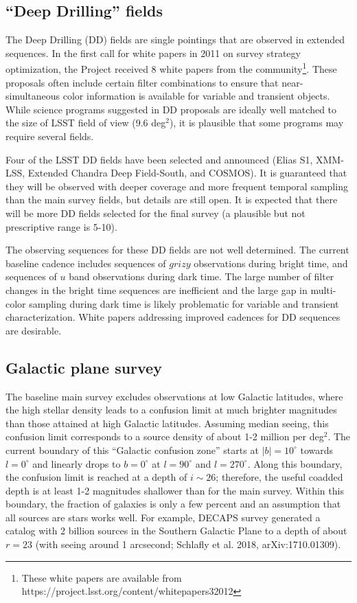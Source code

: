 \documentclass[DM,lsstdraft,toc,usenatbib]{lsstdoc}
\begin{document}
\subsection{``Deep Drilling'' fields} 

The Deep Drilling (DD) fields are single pointings that are observed in extended sequences. 
In the first call for white papers in 2011 on survey strategy optimization, the Project received 
8 white papers from the community\footnote{These white papers are available from 
https://project.lsst.org/content/whitepapers32012}. These proposals often include certain 
filter combinations to ensure that near-simultaneous color information is available for 
variable and transient objects. While science programs suggested in DD proposals are ideally well 
matched to the size of LSST field of view (9.6 deg$^2$), it is plausible that some
programs may require several fields. 

Four of the LSST DD fields have been selected and announced (Elias S1, 
XMM-LSS, Extended Chandra Deep Field-South, and COSMOS). It is guaranteed that they 
will be observed with deeper coverage and more frequent temporal sampling than the main 
survey fields, but details are still open. It is expected that there will be more DD fields 
selected for the final survey (a plausible but not prescriptive range is 5-10). 

The observing sequences for these DD fields are not well determined. The current baseline
cadence includes sequences of $grizy$ observations during bright time, and sequences of $u$ 
band observations during dark time. The large number of filter changes in the bright time sequences
are inefficient and the large gap in multi-color sampling during dark time is likely problematic 
for variable and transient characterization. White papers addressing improved cadences for DD 
sequences are desirable.


\subsection{Galactic plane survey \label{sec:GP}}

The baseline main survey excludes observations at low Galactic latitudes, where the high 
stellar density leads to a confusion limit at much brighter magnitudes than those attained 
at high Galactic latitudes. Assuming median seeing, this confusion limit corresponds to a
source density of about 1-2 million per deg$^2$. The current boundary of this ``Galactic
confusion zone'' starts at $|b|=10^\circ$ towards $l=0^\circ$ and linearly drops to $b=0^\circ$
at $l=90^\circ$ and $l=270^\circ$. Along this boundary, the confusion limit is reached at a
depth of $i \sim 26$; therefore, the useful coadded depth is at least 1-2 magnitudes 
shallower than for the main survey. Within this boundary, the fraction of galaxies is only
a few percent and an assumption that all sources are stars works well. For example, 
DECAPS survey generated a catalog with 2 billion sources in the Southern Galactic Plane
to a depth of about $r=23$ (with seeing around 1 arcsecond; Schlafly et al. 2018, 
arXiv:1710.01309). 
\end{document}
